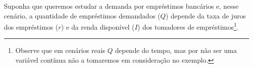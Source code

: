 \begin{comment}
    

Considere um economista imerso na modelagem da oferta e da demanda de um produto em um mercado complexo e em constante mudança. Nesse cenário, um conjunto de variáveis interdependentes, como o preço do produto, a renda dos consumidores, os custos de produção e outros fatores contextuais, podem afetar a quantidade demandada. À medida que nos aproximamos de uma situação específica, surge a necessidade de compreender como pequenas variações em cada um desses fatores podem alterar a quantidade de demanda - efetivamente a função em questão.

Vejamos o exemplo da relação entre o preço do produto e a demanda. Se considerarmos a função que descreve essa relação, estamos interessados em entender como uma leve elevação ou redução no preço pode influenciar a quantidade que os consumidores desejam adquirir. No entanto, essa relação é afetada por outros fatores, como a renda disponível e a existência de produtos substitutos ou complementares.

Aqui, os limites de funções de várias variáveis desempenham um papel fundamental. Eles nos permitem examinar como a quantidade demandada muda em resposta a pequenas mudanças em cada uma das variáveis independentes. Isso significa observar como a demanda se adapta quando o preço sobe ou cai, quando a renda dos consumidores aumenta ou diminui, ou quando os preços de produtos substitutos ou complementares se alteram.

Essa compreensão permite aos economistas prever as consequências de pequenas mudanças em diferentes fatores e tomar decisões informadas. Eles podem estimar como as políticas de preços, flutuações de renda ou mudanças em outros fatores influenciarão a demanda, permitindo que planejem estratégias de mercado mais eficazes.

\end{comment}


Suponha que queremos estudar a demanda por empréstimos bancários e, nesse cenário, a quantidade de empréstimos demandados ($Q$) depende da taxa de juros dos empréstimos (\( r \)) e da renda disponível (\( I \)) dos tomadores de empréstimos\footnote{Observe que em cenários reais $Q$ depende do tempo, mas por não ser uma variável contínua não a tomaremos em consideração no exemplo.}.

